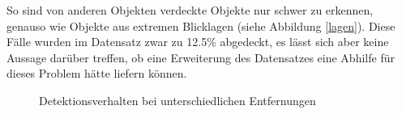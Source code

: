 So sind von anderen Objekten verdeckte Objekte nur schwer zu erkennen, genauso wie Objekte aus extremen Blicklagen (siehe Abbildung \ref{lagen}). Diese Fälle wurden im Datensatz zwar zu 12.5\% abgedeckt, es lässt sich aber keine Aussage darüber treffen, ob eine Erweiterung des Datensatzes eine Abhilfe für dieses Problem hätte liefern können. 

\begin{figure}[ht]
	\hfill
	\hfill
	\hfill
	\caption{Detektionsverhalten bei unterschiedlichen Entfernungen}
	\label{entfernung}
\end{figure}

